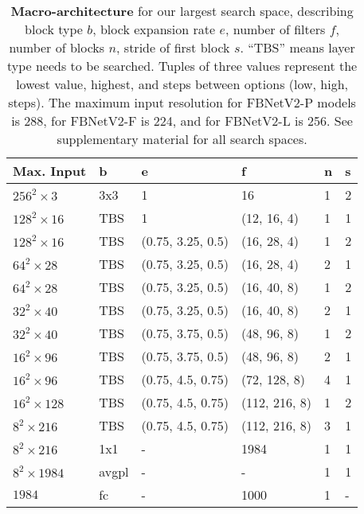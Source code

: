 \documentclass[10pt,twocolumn,letterpaper]{article}
\begin{document}
\begin{table}[h]
\footnotesize
\centering
\caption{\textbf{Macro-architecture} for our largest search space, describing block type $b$, block expansion rate $e$, number of filters $f$, number of blocks $n$, stride of first block $s$. ``TBS'' means layer type needs to be searched. Tuples of three values represent the lowest value, highest, and steps between options (low, high, steps). The maximum input resolution for FBNetV2-P models is 288, for FBNetV2-F is 224, and for FBNetV2-L is 256. See supplementary material for all search spaces. }



\begin{tabular*}{0.48\textwidth}{l @{\extracolsep{\fill}} lllll}
\toprule
Max. Input              & b           & e         & f          & n        & s \\ \midrule
$256^2 \times 3$          & 3x3         & 1         & 16         & 1        & 2 \\

$128^2 \times 16$ 	 & TBS 	 & 1 	 & (12, 16, 4) 	 & 1 	 & 1 \\
$128^2 \times 16$ 	 & TBS 	 & (0.75, 3.25, 0.5) 	 & (16, 28, 4) 	 & 1 	 & 2 \\
$64^2 \times 28$ 	 & TBS 	 & (0.75, 3.25, 0.5) 	 & (16, 28, 4) 	 & 2 	 & 1 \\
$64^2 \times 28$ 	 & TBS 	 & (0.75, 3.25, 0.5) 	 & (16, 40, 8) 	 & 1 	 & 2 \\
$32^2 \times 40$ 	 & TBS 	 & (0.75, 3.25, 0.5) 	 & (16, 40, 8) 	 & 2 	 & 1 \\
$32^2 \times 40$ 	 & TBS 	 & (0.75, 3.75, 0.5) 	 & (48, 96, 8) 	 & 1 	 & 2 \\
$16^2 \times 96$ 	 & TBS 	 & (0.75, 3.75, 0.5) 	 & (48, 96, 8) 	 & 2 	 & 1 \\
$16^2 \times 96$ 	 & TBS 	 & (0.75, 4.5, 0.75) 	 & (72, 128, 8) 	 & 4 	 & 1 \\
$16^2 \times 128$ 	 & TBS 	 & (0.75, 4.5, 0.75) 	 & (112, 216, 8) 	 & 1 	 & 2 \\
$8^2 \times 216$ 	 & TBS 	 & (0.75, 4.5, 0.75) 	 & (112, 216, 8) 	 & 3 	 & 1 \\
$8^2 \times 216$        & 1x1         & -         & 1984       & 1        & 1           \\
$8^2 \times 1984$       & avgpl     & -         & -          & 1        & 1           \\
$1984$                  & fc          & -         & 1000       & 1        & -      \\ \bottomrule
\end{tabular*}

\label{tab:macro-space}
\end{table}
\end{document}

